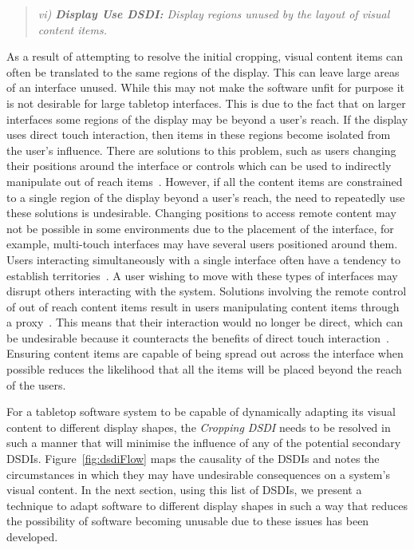 \documentclass[review,5p,times,twocolumn]{elsarticle}
\begin{document}
\begin{quote}\emph{vi) \textbf{Display Use \ac{DSDI}:} Display regions unused by the layout of visual content items.}\end{quote}

As a result of attempting to resolve the initial cropping, visual content items can often be translated to the same regions of the display.
This can leave large areas of an interface unused.
While this may not make the software unfit for purpose it is not desirable for large tabletop interfaces.
This is due to the fact that on larger interfaces some regions of the display may be beyond a user's reach.
If the display uses direct touch interaction, then items in these regions become isolated from the user's influence.
There are solutions to this problem, such as users changing their positions around the interface or controls which can be used to indirectly manipulate out of reach items~\cite{Ryall2006a}.
However, if all the content items are constrained to a single region of the display beyond a user's reach, the need to repeatedly use these solutions is undesirable.
Changing positions to access remote content may not be possible in some environments due to the placement of the interface, for example, multi-touch interfaces may have several users positioned around them.
Users interacting simultaneously with a single interface often have a tendency to establish territories~\cite{scott2004}.
A user wishing to move with these types of interfaces may disrupt others interacting with the system.
Solutions involving the remote control of out of reach content items result in users manipulating content items through a proxy~\cite{Smith11}.
This means that their interaction would no longer be direct, which can be undesirable because it counteracts the benefits of direct touch interaction~\cite{Schoning2008}.
Ensuring content items are capable of being spread out across the interface when possible reduces the likelihood that all the items will be placed beyond the reach of the users.

For a tabletop software system to be capable of dynamically adapting its visual content to different display shapes, the {\emph{Cropping \ac{DSDI}}} needs to be resolved in such a manner that will minimise the influence of any of the potential secondary \acp{DSDI}.
Figure~\ref{fig:dsdiFlow} maps the causality of the \acp{DSDI} and notes the circumstances in which they may have undesirable consequences on a system's visual content.
In the next section, using this list of \acp{DSDI}, we present a technique to adapt software to different display shapes in such a way that reduces the possibility of software becoming unusable due to these issues has been developed.
\end{document}
